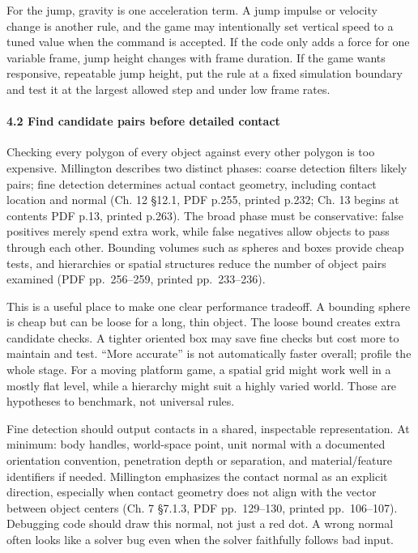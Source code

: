 For the jump, gravity is one acceleration term. A jump impulse or velocity change is another rule, and the game may intentionally set vertical speed to a tuned value when the command is accepted. If the code only adds a force for one variable frame, jump height changes with frame duration. If the game wants responsive, repeatable jump height, put the rule at a fixed simulation boundary and test it at the largest allowed step and under low frame rates.

\paragraph{4.2 Find candidate pairs before detailed contact}\label{06-engine-ii-ch033-find-candidate-pairs-before-detailed-contact}

\hypertarget{06-engine-ii-ch033-find-candidate-pairs-before-detailed-contact}{}

Checking every polygon of every object against every other polygon is too expensive. Millington describes two distinct phases: coarse detection filters likely pairs; fine detection determines actual contact geometry, including contact location and normal (Ch. 12 §12.1, PDF p.255, printed p.232; Ch. 13 begins at contents PDF p.13, printed p.263). The broad phase must be conservative: false positives merely spend extra work, while false negatives allow objects to pass through each other. Bounding volumes such as spheres and boxes provide cheap tests, and hierarchies or spatial structures reduce the number of object pairs examined (PDF pp.~256--259, printed pp.~233--236).

This is a useful place to make one clear performance tradeoff. A bounding sphere is cheap but can be loose for a long, thin object. The loose bound creates extra candidate checks. A tighter oriented box may save fine checks but cost more to maintain and test. ``More accurate'' is not automatically faster overall; profile the whole stage. For a moving platform game, a spatial grid might work well in a mostly flat level, while a hierarchy might suit a highly varied world. Those are hypotheses to benchmark, not universal rules.

Fine detection should output contacts in a shared, inspectable representation. At minimum: body handles, world-space point, unit normal with a documented orientation convention, penetration depth or separation, and material/feature identifiers if needed. Millington emphasizes the contact normal as an explicit direction, especially when contact geometry does not align with the vector between object centers (Ch. 7 §7.1.3, PDF pp.~129--130, printed pp.~106--107). Debugging code should draw this normal, not just a red dot. A wrong normal often looks like a solver bug even when the solver faithfully follows bad input.

